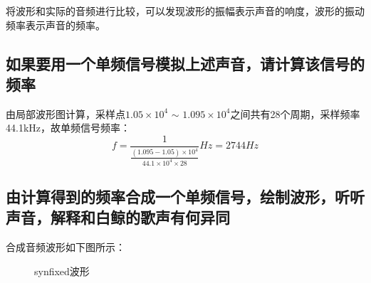 \documentclass{article}
\begin{document}
            将波形和实际的音频进行比较，可以发现波形的振幅表示声音的响度，波形的振动频率表示声音的频率。

        \subsection{如果要用一个单频信号模拟上述声音，请计算该信号的频率}
            由局部波形图计算，采样点$1.05\times10^4$ $\sim$ $1.095\times10^4$之间共有28个周期，采样频率44.1kHz，故单频信号频率：
            $$f=\frac{1}{\frac{(1.095-1.05)\times10^4}{44.1\times10^4\times28}}Hz=2744Hz$$

        \subsection{由计算得到的频率合成一个单频信号，绘制波形，听听声音，解释和白鲸的歌声有何异同}
            合成音频波形如下图所示：
            \begin{figure}[htb]
                \centering
                \hspace{10pt}
                \caption{synfixed波形}
                \label{fig:synfixed}
            \end{figure}
\end{document}

